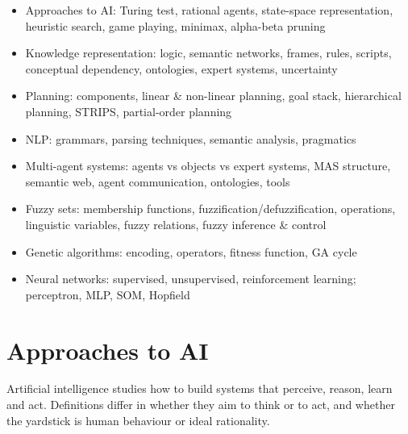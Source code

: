 

\begin{sylbox}

\begin{itemize}
\tightlist
\item[$\square$]
  Approaches to AI: Turing test, rational agents, state-space representation, heuristic search, game playing, minimax, alpha-beta pruning
\item[$\square$]
  Knowledge representation: logic, semantic networks, frames, rules, scripts, conceptual dependency, ontologies, expert systems, uncertainty
\item[$\square$]
  Planning: components, linear \& non-linear planning, goal stack, hierarchical planning, STRIPS, partial-order planning
\item[$\square$]
  NLP: grammars, parsing techniques, semantic analysis, pragmatics
\item[$\square$]
  Multi-agent systems: agents vs objects vs expert systems, MAS structure, semantic web, agent communication, ontologies, tools
\item[$\square$]
  Fuzzy sets: membership functions, fuzzification/defuzzification, operations, linguistic variables, fuzzy relations, fuzzy inference \& control
\item[$\square$]
  Genetic algorithms: encoding, operators, fitness function, GA cycle
\item[$\square$]
  Neural networks: supervised, unsupervised, reinforcement learning; perceptron, MLP, SOM, Hopfield
\end{itemize}

\end{sylbox}

\needspace{160pt}

\hypertarget{p2-10--1-approaches-to-ai}{%
\section{Approaches to AI}\label{p2-10--1-approaches-to-ai}}

Artificial intelligence studies how to build systems that perceive, reason, learn and act. Definitions differ in
whether they aim to think or to act, and whether the yardstick is human behaviour or ideal rationality.

